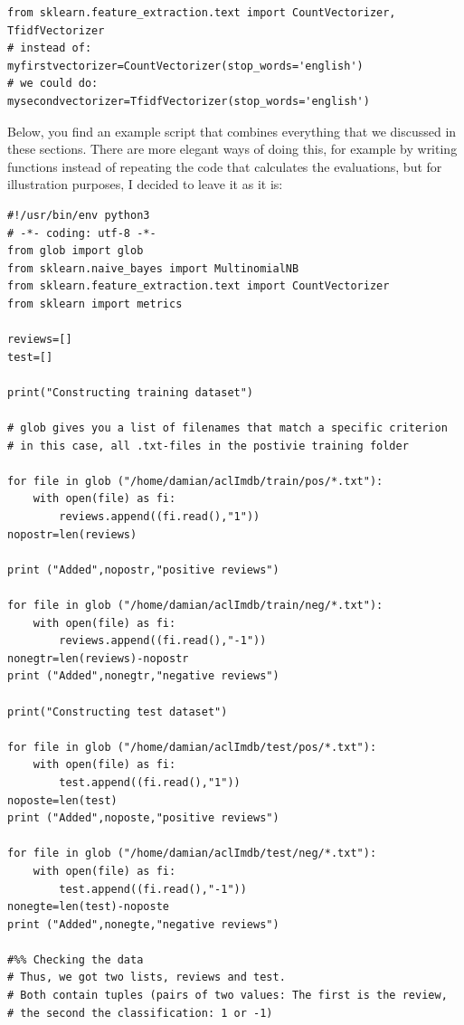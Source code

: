\documentclass[a4paper,12pt]{book}
\begin{document}
\begin{lstlisting}
from sklearn.feature_extraction.text import CountVectorizer, TfidfVectorizer
# instead of:
myfirstvectorizer=CountVectorizer(stop_words='english')
# we could do:
mysecondvectorizer=TfidfVectorizer(stop_words='english')
\end{lstlisting}

Below, you find an example script that combines everything that we discussed in these sections. There are more elegant ways of doing this, for example by writing functions instead of repeating the code that calculates the evaluations, but for illustration purposes, I decided to leave it as it is:




\begin{lstlisting}
#!/usr/bin/env python3
# -*- coding: utf-8 -*-
from glob import glob
from sklearn.naive_bayes import MultinomialNB
from sklearn.feature_extraction.text import CountVectorizer
from sklearn import metrics

reviews=[]
test=[]

print("Constructing training dataset")

# glob gives you a list of filenames that match a specific criterion
# in this case, all .txt-files in the postivie training folder

for file in glob ("/home/damian/aclImdb/train/pos/*.txt"):
    with open(file) as fi:
        reviews.append((fi.read(),"1"))
nopostr=len(reviews)

print ("Added",nopostr,"positive reviews")  

for file in glob ("/home/damian/aclImdb/train/neg/*.txt"):
    with open(file) as fi:
        reviews.append((fi.read(),"-1"))
nonegtr=len(reviews)-nopostr
print ("Added",nonegtr,"negative reviews")  
   
print("Constructing test dataset")

for file in glob ("/home/damian/aclImdb/test/pos/*.txt"):
    with open(file) as fi:
        test.append((fi.read(),"1"))
noposte=len(test)
print ("Added",noposte,"positive reviews")  

for file in glob ("/home/damian/aclImdb/test/neg/*.txt"):
    with open(file) as fi:
        test.append((fi.read(),"-1"))
nonegte=len(test)-noposte
print ("Added",nonegte,"negative reviews")  

#%% Checking the data
# Thus, we got two lists, reviews and test.
# Both contain tuples (pairs of two values: The first is the review, 
# the second the classification: 1 or -1)
    

\end{lstlisting}
\end{document}
